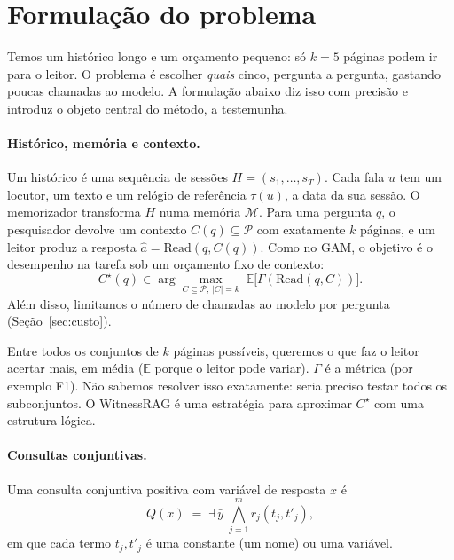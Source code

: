 \documentclass[11pt]{article}
\begin{document}
\section{Formulação do problema}\label{sec:problema}

\begin{intuicao}
Temos um histórico longo e um orçamento pequeno: só $k=5$ páginas podem ir
para o leitor. O problema é escolher \emph{quais} cinco, pergunta a pergunta,
gastando poucas chamadas ao modelo. A formulação abaixo diz isso com
precisão e introduz o objeto central do método, a testemunha.
\end{intuicao}

\paragraph{Histórico, memória e contexto.}
Um histórico é uma sequência de sessões $H=(s_1,\dots,s_T)$. Cada fala $u$
tem um locutor, um texto e um relógio de referência $\tau(u)$, a data da sua
sessão. O memorizador transforma $H$ numa memória $\mathcal{M}$. Para uma
pergunta $q$, o pesquisador devolve um contexto $C(q)\subseteq\mathcal{P}$
com exatamente $k$ páginas, e um leitor produz a resposta
$\hat a=\mathrm{Read}(q,C(q))$. Como no GAM, o objetivo é o desempenho na
tarefa sob um orçamento fixo de contexto:
\begin{equation}
  C^\star(q)\in\arg\max_{C\subseteq\mathcal{P},\,|C|=k}
  \;\mathbb{E}\bigl[\Gamma(\mathrm{Read}(q,C))\bigr].
  \label{eq:objetivo}
\end{equation}
Além disso, limitamos o número de chamadas ao modelo por pergunta
(Seção~\ref{sec:custo}).

\begin{empalavras}
Entre todos os conjuntos de $k$ páginas possíveis, queremos o que faz o
leitor acertar mais, em média ($\mathbb{E}$ porque o leitor pode variar).
$\Gamma$ é a métrica (por exemplo F1). Não sabemos resolver isso exatamente:
seria preciso testar todos os subconjuntos. O WitnessRAG é uma estratégia para
aproximar $C^\star$ com uma estrutura lógica.
\end{empalavras}

\paragraph{Consultas conjuntivas.}
Uma consulta conjuntiva positiva com variável de resposta $x$ é
\begin{equation}
  Q(x)\;=\;\exists\,\bar y\;\bigwedge_{j=1}^{m} r_j(t_j, t'_j),
  \label{eq:cq}
\end{equation}
em que cada termo $t_j,t'_j$ é uma constante (um nome) ou uma variável.
\end{document}
